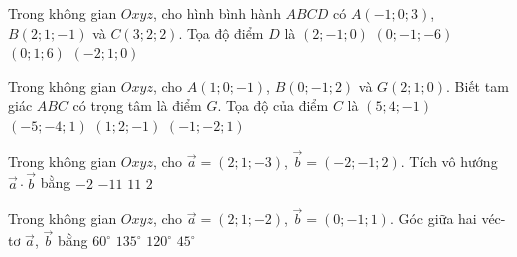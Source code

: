 \begin{ex}%
	Trong không gian $ Oxyz $, cho hình bình hành $ ABCD $ có $ A(-1;0;3) $, $ B(2;1;-1) $ và $ C(3;2;2) $. Tọa độ điểm $ D $ là
	\choice
	{$ (2;-1;0) $}
	{$ (0;-1;-6) $}
	{\True $ (0;1;6) $}
	{$ (-2;1;0) $}
\end{ex}

\begin{ex}%
	Trong không gian $ Oxyz $, cho $ A(1;0;-1) $, $ B(0;-1;2) $ và $ G(2;1;0) $. Biết tam giác $ ABC $ có trọng tâm là điểm $ G $. Tọa độ của điểm $ C $ là
	\choice
	{\True $ (5;4;-1) $}
	{$ (-5;-4;1) $}
	{$ (1;2;-1) $}
	{$ (-1;-2;1) $}
\end{ex}

\begin{ex}%
	Trong không gian $ Oxyz $, cho $ \vec{a}=(2;1;-3) $, $ \vec{b}=(-2;-1;2) $. Tích vô hướng $ \vec{a}\cdot\vec{b} $ bằng
	\choice
	{$ -2 $}
	{\True$ -11 $}
	{$ 11 $}
	{$ 2 $}
\end{ex}

\begin{ex}%
	Trong không gian $ Oxyz $, cho $ \vec{a}=(2;1;-2) $, $ \vec{b}=(0;-1;1) $. Góc giữa hai véc-tơ $ \vec{a} $, $ \vec{b} $ bằng
	\choice
	{$ 60^{\circ} $}
	{\True $ 135^{\circ} $}
	{$ 120^{\circ} $}
	{\True $ 45^{\circ} $}
\end{ex}

